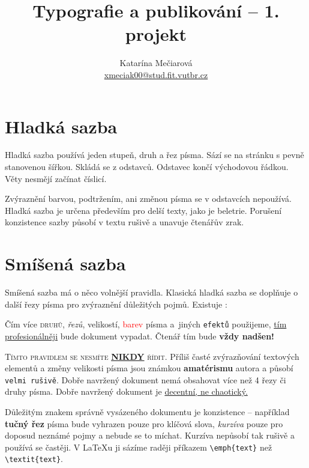 \documentclass[10pt, twocolumn]{article}[25.2.2024]
\title{Typografie a publikování -- 1. projekt}
\author{Katarína Mečiarová\\ \href{mailto: xmeciak00@stud.fit.vutbr.cz}{xmeciak00@stud.fit.vutbr.cz}}
\date{ }
\begin{document}
    \maketitle


    \section{Hladká sazba}
        Hladká sazba používá jeden stupeň, druh a řez písma.
        Sází se na stránku s pevně stanovenou šířkou.
        Skládá se z odstavců. Odstavec končí východovou řádkou.
        Věty nesmějí začínat číslicí.

        Zvýraznění barvou, podtržením, ani změnou písma se v odstavcích nepoužívá.
        Hladká sazba je určena především pro delší texty, jako je beletrie.
        Porušení konzistence sazby působí v textu rušivě a unavuje čtenářův zrak.

    \section{Smíšená sazba}
        Smíšená sazba má o něco volnější pravidla.
        Klasická hladká sazba se doplňuje o další řezy písma pro zvýraznění důležitých pojmů.
        Existuje :

        \medskip
        \begin{adjustwidth}{0.75cm}{0.75cm}
        \hspace{0.3cm}
        Čím více \textsc{druhů}, \emph{řezů}, {\scriptsize velikostí}, \textcolor{red}{barev} písma a~jiných \texttt{efektů} použijeme, \underline{tím profesionálněji}
        bude {\selectfont dokument} vypadat. Čtenář tím bude {\Large \bfseries vždy nadšen!}
        \end{adjustwidth}
        \medskip

        \textsc{Tímto pravidlem se nesmíte \underline{\textbf{\MakeUppercase{\footnotesize nikdy}}} řídit.}
        Příliš časté zvýrazňování textových elementů a změny {\tiny velikosti} písma jsou známkou \textbf{amatérismu} autora a působí \texttt{velmi rušivě}.
        Dobře navržený dokument nemá obsahovat více než 4 řezy či druhy písma.
        Dobře navržený dokument je \underline{decentní, ne chaotický.}

        Důležitým znakem správně vysázeného dokumentu je konzistence -- například \textbf{tučný řez} písma bude vyhrazen pouze pro klíčová slova, \textit{kurzíva} pouze pro doposud neznámé pojmy a nebude se to míchat.
        Kurzíva nepůsobí tak rušivě a používá se častěji.
        V \LaTeX u ji sázíme raději příkazem \verb|\emph{text}| než \verb|\textit{text}|.
\end{document}
